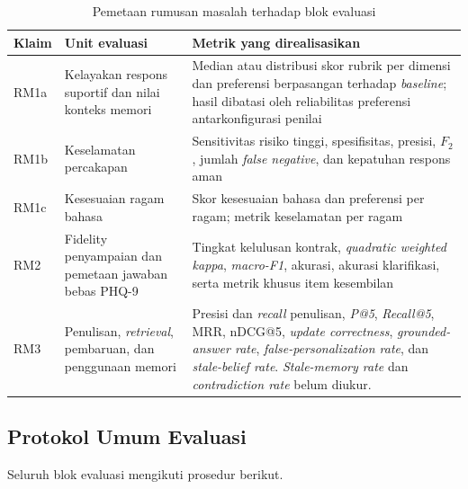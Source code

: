 \begin{table}[!htbp]
\centering
\caption{Pemetaan rumusan masalah terhadap blok evaluasi}
\label{tab:v2-pemetaan-evaluasi}
{\footnotesize
\begin{tabularx}{\textwidth}{|>{\raggedright\arraybackslash}p{2.0cm}|>{\raggedright\arraybackslash}p{3.2cm}|>{\raggedright\arraybackslash}X|}
\hline
\rowcolor{tableheadgray}
\textbf{Klaim} & \textbf{Unit evaluasi} & \textbf{Metrik yang direalisasikan} \\
\hline
RM1a & Kelayakan respons suportif dan nilai konteks memori & Median atau distribusi skor rubrik per dimensi dan preferensi berpasangan terhadap \textit{baseline}; hasil dibatasi oleh reliabilitas preferensi antarkonfigurasi penilai \\
\hline
RM1b & Keselamatan percakapan & Sensitivitas risiko tinggi, spesifisitas, presisi, $F_2$, jumlah \textit{false negative}, dan kepatuhan respons aman \\
\hline
RM1c & Kesesuaian ragam bahasa & Skor kesesuaian bahasa dan preferensi per ragam; metrik keselamatan per ragam \\
\hline
RM2 & Fidelity penyampaian dan pemetaan jawaban bebas PHQ-9 & Tingkat kelulusan kontrak, \textit{quadratic weighted kappa}, \textit{macro-F1}, akurasi, akurasi klarifikasi, serta metrik khusus item kesembilan \\
\hline
RM3 & Penulisan, \textit{retrieval}, pembaruan, dan penggunaan memori & Presisi dan \textit{recall} penulisan, \textit{P@5}, \textit{Recall@5}, MRR, nDCG@5, \textit{update correctness}, \textit{grounded-answer rate}, \textit{false-personalization rate}, dan \textit{stale-belief rate}. \textit{Stale-memory rate} dan \textit{contradiction rate} belum diukur. \\

\hline
\end{tabularx}
}
\end{table}

\subsection{Protokol Umum Evaluasi}

Seluruh blok evaluasi mengikuti prosedur berikut.

